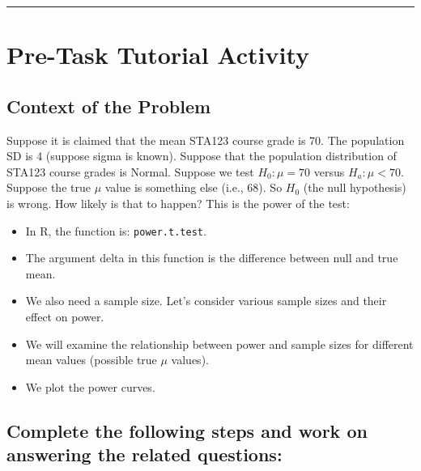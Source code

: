 \documentclass[oneside,openany]{book}
\providecommand{\tightlist}{%
  \setlength{\itemsep}{0pt}\setlength{\parskip}{0pt}}
\begin{document}
\begin{center}\rule{0.5\linewidth}{0.5pt}\end{center}

\section{Pre-Task Tutorial Activity}\label{pre-task-tutorial-activity-3}

\subsection{Context of the Problem}\label{context-of-the-problem}

Suppose it is claimed that the mean STA123 course grade is 70. The population SD is 4 (suppose sigma is known). Suppose that the population distribution of STA123 course grades is Normal. Suppose we test \(H_0: \mu = 70\) versus \(H_a: \mu < 70\). Suppose the true \(\mu\) value is something else (i.e., 68). So \(H_0\) (the null hypothesis) is wrong. How likely is that to happen? This is the power of the test:

\begin{itemize}
\tightlist
\item
  In R, the function is: \texttt{power.t.test}.
\item
  The argument delta in this function is the difference between null and true mean.
\item
  We also need a sample size. Let's consider various sample sizes and their effect on power.
\item
  We will examine the relationship between power and sample sizes for different mean values (possible true \(\mu\) values).
\item
  We plot the power curves.
\end{itemize}

\subsection{Complete the following steps and work on answering the related questions:}\label{complete-the-following-steps-and-work-on-answering-the-related-questions}
\end{document}
